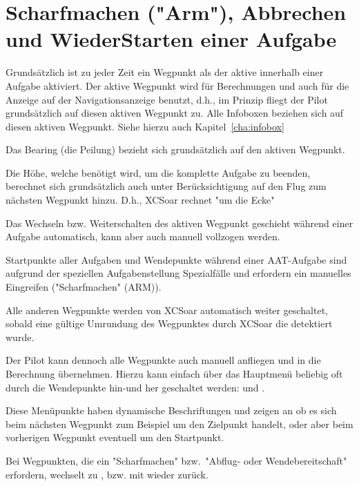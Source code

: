 \section{Scharfmachen  ("Arm"), Abbrechen   und WiederStarten  einer Aufgabe}
\label{sec:advanc-rest-tasks}
Grundsätzlich ist zu jeder Zeit ein Wegpunkt als der aktive innerhalb einer Aufgabe aktiviert.
Der aktive Wegpunkt wird für Berechnungen und auch für die Anzeige auf der Navigationsanzeige benutzt, d.h., im Prinzip fliegt der Pilot grundsätzlich auf diesen aktiven Wegpunkt zu.
\textcolor[rgb]{0.00,0.00,0.50}{Alle Infoboxen  beziehen sich auf diesen aktiven Wegpunkt}.
Siehe hierzu auch Kapitel~\ref{cha:infobox}

Das Bearing (die Peilung) bezieht sich grundsätzlich auf den aktiven Wegpunkt.

Die Höhe, welche benötigt wird, um die komplette Aufgabe zu beenden, berechnet sich grundsätzlich auch unter Berücksichtigung auf den Flug zum nächsten Wegpunkt hinzu. D.h., \textsf{XCSoar} rechnet "um die Ecke"

Das Wechseln bzw. Weiterschalten des aktiven Wegpunkt geschieht während einer Aufgabe automatisch, kann aber auch manuell vollzogen werden.

Startpunkte aller Aufgaben und Wendepunkte während einer AAT-Aufgabe sind aufgrund der speziellen Aufgabenstellung  Spezialfälle und erfordern ein manuelles Eingreifen ("Scharfmachen" (ARM)).

Alle anderen Wegpunkte werden von \textsf{XCSoar} automatisch weiter geschaltet, sobald eine gültige Umrundung  des Wegpunktes durch \textsf{XCSoar} die detektiert wurde.

Der Pilot kann dennoch alle Wegpunkte auch manuell anfliegen und in die Berechnung übernehmen. Hierzu kann einfach über das Hauptmenü beliebig oft durch die Wendepunkte hin-und her geschaltet werden:
\blink{} und
\blink{}.  

Diese Menüpunkte haben dynamische Beschriftungen und zeigen an ob es sich beim nächsten Wegpunkt zum Beispiel um den Zielpunkt handelt, oder aber beim vorherigen Wegpunkt eventuell um den Startpunkt.

Bei Wegpunkten, die ein "Scharfmachen"  bzw.\ "Abflug- oder Wendebereitschaft" erfordern, wechselt \blink{} zu , bzw. mit  wieder zurück.

